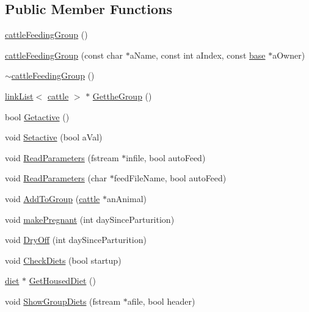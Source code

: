\subsection*{Public Member Functions}
\begin{DoxyCompactItemize}
\item 
\hyperlink{classcattle_feeding_group_a5291be5d6b47e4250cf670b16735924d}{cattleFeedingGroup} ()
\item 
\hyperlink{classcattle_feeding_group_a8e091ad706e908bd22d1fe11ba7b603c}{cattleFeedingGroup} (const char $\ast$aName, const int aIndex, const \hyperlink{classbase}{base} $\ast$aOwner)
\item 
\hyperlink{classcattle_feeding_group_a3375159bc6fe10277b6bd26070b8d353}{$\sim$cattleFeedingGroup} ()
\item 
\hyperlink{classlink_list}{linkList}$<$ \hyperlink{classcattle}{cattle} $>$ $\ast$ \hyperlink{classcattle_feeding_group_a99c758b7537261042a5c5898249041f6}{GettheGroup} ()
\item 
bool \hyperlink{classcattle_feeding_group_af1702dff1ca9254e2b31a20fded5b85d}{Getactive} ()
\item 
void \hyperlink{classcattle_feeding_group_ae5b02aeeb62dede88726515fe5868695}{Setactive} (bool aVal)
\item 
void \hyperlink{classcattle_feeding_group_a58423d35bf42c9277a67eadbe8cadad0}{ReadParameters} (fstream $\ast$infile, bool autoFeed)
\item 
void \hyperlink{classcattle_feeding_group_ae4b1101582a0d6cbb8246b1c01eb415b}{ReadParameters} (char $\ast$feedFileName, bool autoFeed)
\item 
void \hyperlink{classcattle_feeding_group_a3782389717c9de1fe181a04802890e43}{AddToGroup} (\hyperlink{classcattle}{cattle} $\ast$anAnimal)
\item 
void \hyperlink{classcattle_feeding_group_a9b47f29ee4cfa7b3827537f14eaadfb4}{makePregnant} (int daySinceParturition)
\item 
void \hyperlink{classcattle_feeding_group_a6b69cca3e3f6fd7f67fb691874aea2bb}{DryOff} (int daySinceParturition)
\item 
void \hyperlink{classcattle_feeding_group_a620bdb68d80e077f170ea3086c15c9b6}{CheckDiets} (bool startup)
\item 
\hyperlink{classdiet}{diet} $\ast$ \hyperlink{classcattle_feeding_group_a7f6f95c30e21858d046012f881b01e98}{GetHousedDiet} ()
\item 
void \hyperlink{classcattle_feeding_group_a7f878fe86db6f4ff6939ae336e073fe4}{ShowGroupDiets} (fstream $\ast$afile, bool header)

\end{DoxyCompactItemize}
